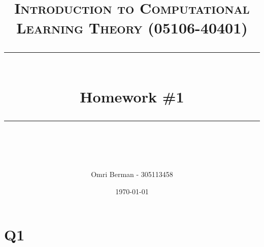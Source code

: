 \documentclass{article} %
\title{
\normalfont \normalsize 
\textsc{Introduction to Computational Learning Theory (05106-40401)} \\
[10pt] 
\rule{\linewidth}{0.5pt} \\[6pt] 
\huge Homework \#1 \\
\rule{\linewidth}{2pt}  \\[10pt]
}
\author{Omri Berman - 305113458}
\date{\normalsize \today}
\begin{document}
\maketitle
\noindent

\section*{Q1}


% 

% 

% 

% 

% 

% 

% 
\end{document}
